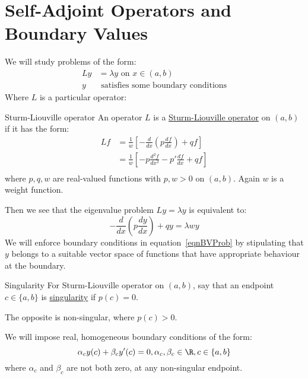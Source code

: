 \documentclass[../Main.tex]{subfiles}
\begin{document}
\section{Self-Adjoint Operators and Boundary Values}
We will study problems of the form:
\begin{align}
    Ly &= \lambda y \text{ on } x\in(a, b) \label{eqnBVProb} \\
    y &\text{ satisfies some boundary conditions} \nonumber
\end{align}
Where $L$ is a particular operator:
\begin{definition}{Sturm-Liouville operator}
    An operator $L$ is a \underline{Sturm-Liouville operator} on $(a, b)$ if it has the form:
    \begin{align*}
        Lf &= \frac{1}{w}\left[-\frac{d}{dx}\left(p \frac{d^{}f}{dx^{}}\right) + qf\right] \\
        &= \frac{1}{w}\left[-p \frac{d^{2}f}{dx^{2}} - p' \frac{d^{}f}{dx^{}} + qf\right] \\
    \end{align*}
    where $p, q, w$ are real-valued functions with $p, w > 0$ on $(a, b)$. Again $w$ is a weight function.
\end{definition}
Then we see that the eigenvalue problem $Ly = \lambda y$ is equivalent to:
\begin{equation}
    -\frac{d}{dx}\left(p \frac{dy}{dx}\right) + qy = \lambda w y
    \label{eqnSLProb}
\end{equation}
We will enforce boundary conditions in equation~\ref{eqnBVProb} by stipulating that $y$ belongs to a suitable vector space of functions that have appropriate behaviour at the boundary.
\begin{definition}{Singularity}
    For Sturm-Liouville operator on $(a, b)$, say that an endpoint $c \in \{a, b\}$ is \underline{singularity} if $p(c) = 0$.

    The opposite is non-singular, where $p(c) > 0$.
\end{definition}
We will impose real, homogeneous boundary conditions of the form:
\begin{equation}
    \alpha_c y(c) + \beta_c y'(c) = 0, \alpha_c, \beta_c \in \R, c \in \{a, b\}
    \label{eqnBoundaryCondition}
\end{equation}
where $\alpha_c$ and $\beta_c$ are not both zero, at any non-singular endpoint.
\end{document}
